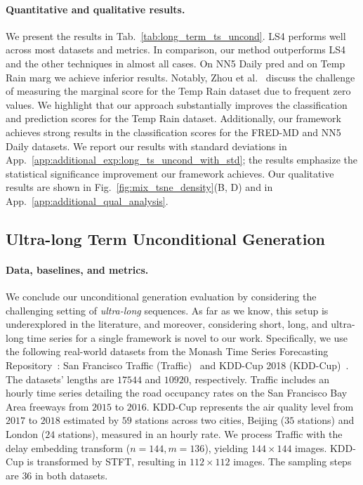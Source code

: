 \documentclass{article}
\begin{document}
\paragraph{Quantitative and qualitative results.} We present the results in Tab.~\ref{tab:long_term_ts_uncond}. LS4 performs well across most datasets and metrics. In comparison, our method outperforms LS4 and the other techniques in almost all cases. On NN5 Daily pred and on Temp Rain marg we achieve inferior results. Notably, Zhou et al.~\cite{zhou2023deep} discuss the challenge of measuring the marginal score for the Temp Rain dataset due to frequent zero values. We highlight that our approach substantially improves the classification and prediction scores for the Temp Rain dataset. Additionally, our framework achieves strong results in the classification scores for the FRED-MD and NN5 Daily datasets. We report our results with standard deviations in App.~\ref{app:additional_exp:long_ts_uncond_with_std}; the results emphasize the statistical significance improvement our framework achieves. Our qualitative results are shown in Fig.~\ref{fig:mix_tsne_density}(B, D) and in App.~\ref{app:additional_qual_analysis}.


\subsection{Ultra-long Term Unconditional Generation}
\label{subsec:experimets_ultra_long_time_series}


\paragraph{Data, baselines, and metrics.}  We conclude our unconditional generation evaluation by considering the challenging setting of \emph{ultra-long} sequences. As far as we know, this setup is underexplored in the literature, and moreover, considering short, long, and ultra-long time series for a single framework is novel to our work. Specifically, we use the following real-world datasets from the Monash Time Series Forecasting Repository~\cite{godahewa2021monash}: San Francisco Traffic (Traffic)~\cite{lai2018modeling} and KDD-Cup 2018 (KDD-Cup)~\cite{luo2019accuair}. The datasets' lengths are $17544$ and $10920$, respectively. Traffic includes an hourly time series detailing the road occupancy rates on the San Francisco Bay Area freeways from $2015$ to $2016$. KDD-Cup represents the air quality level from $2017$ to $2018$ estimated by $59$ stations across two cities, Beijing ($35$ stations) and London ($24$ stations), measured in an hourly rate. We process Traffic with the delay embedding transform ($n=144, m=136$), yielding $144 \times 144$ images. KDD-Cup is transformed by STFT, resulting in $112 \times 112$ images. The sampling steps are $36$ in both datasets. 
\end{document}
